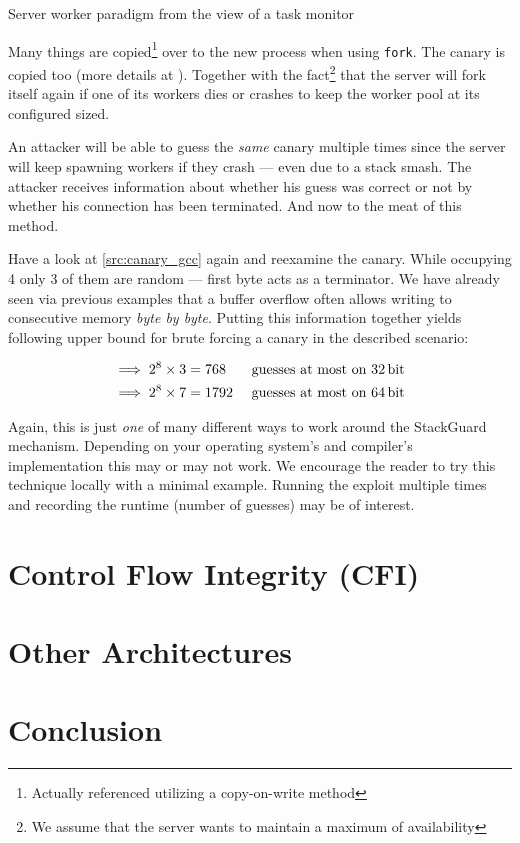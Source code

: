 \documentclass[article]{uibk}
\begin{document}
\begin{listing}[h!]
    \caption{Server worker paradigm from the view of a task monitor}
    \label{src:server_worker}
\end{listing}

Many things are copied\footnote{Actually referenced utilizing a copy-on-write
method} over to the new process when using \texttt{fork}. The canary is copied
too (more details at \cite{phrack_stack_guard2}). Together with the
fact\footnote{We assume that the server wants to maintain a maximum of
availability} that the server will fork itself again if one of its workers dies
or crashes to keep the worker pool at its configured sized.

An attacker will be able to guess the \emph{same} canary multiple times since
the server will keep spawning workers if they crash --- even due to a stack
smash. The attacker receives information about whether his guess was correct or
not by whether his connection has been terminated. And now to the meat of this
method.

Have a look at \cref{src:canary_gcc} again and reexamine the canary. While
occupying \SI{4}{\byte} only 3 of them are random --- first byte acts as a
terminator. We have already seen via previous examples that a buffer overflow
often allows writing to consecutive memory \emph{byte by byte}. Putting this
information together yields following upper bound for brute forcing a canary in
the described scenario:

\begin{align*}
    \implies 2^8 \times 3 & = 768  & \text{ guesses at most on \SI{32}{\bit}}\\
    \implies 2^8 \times 7 & = 1792 & \text{ guesses at most on \SI{64}{\bit}}
\end{align*}

Again, this is just \emph{one} of many different ways to work around the
StackGuard mechanism. Depending on your operating system's and compiler's
implementation this may or may not work. We encourage the reader to try this
technique locally with a minimal example. Running the exploit multiple times
and recording the runtime (number of guesses) may be of interest.

\newpage

\section{Control Flow Integrity (CFI)}

\newpage

\section{Other Architectures}

\newpage

\section{Conclusion}


\end{document}
